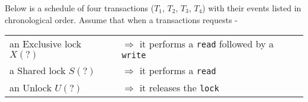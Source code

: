 


\question Below is a schedule of four transactions ($T_1$, $T_2$, 
$T_3$, $T_4$) with their events listed in chronological order. 
Assume that when a transactions requests -\\
\watchout
\begin{tabular}{ll}
an Exclusive lock $X(?)$ &$\Rightarrow$ it performs a \texttt{read} followed by a \texttt{write} \\
a  Shared lock $S(?)$    &$\Rightarrow$ it performs a \texttt{read} \\
an Unlock $U(?)$         &$\Rightarrow$ it releases the \texttt{lock} \\
\end{tabular}
\\
